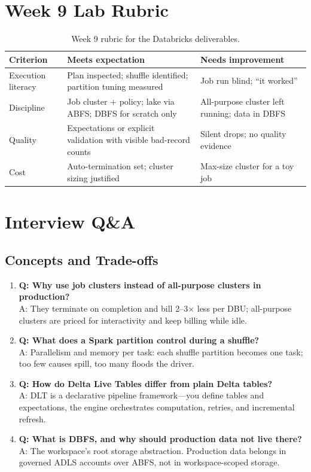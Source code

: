 \section{Week 9 Lab Rubric}
\begin{table}[H]
\centering
\small
\begin{tabular}{@{}p{3.2cm}p{5.0cm}p{5.0cm}@{}}
\toprule
\textbf{Criterion} & \textbf{Meets expectation} & \textbf{Needs improvement} \\
\midrule
Execution literacy & Plan inspected; shuffle identified; partition tuning measured & Job run blind; ``it worked'' \\
Discipline & Job cluster + policy; lake via ABFS; DBFS for scratch only & All-purpose cluster left running; data in DBFS \\
Quality & Expectations or explicit validation with visible bad-record counts & Silent drops; no quality evidence \\
Cost & Auto-termination set; cluster sizing justified & Max-size cluster for a toy job \\
\bottomrule
\end{tabular}
\caption{Week 9 rubric for the Databricks deliverables.}
\label{tab:ch9-rubric}
\end{table}

\section{Interview Q\&A}
\subsection{Concepts and Trade-offs}
\begin{enumerate}
    \item \textbf{Q: Why use job clusters instead of all-purpose clusters in production?}\\
    A: They terminate on completion and bill 2--3$\times$ less per DBU; all-purpose clusters are priced for interactivity and keep billing while idle.
    \item \textbf{Q: What does a Spark partition control during a shuffle?}\\
    A: Parallelism and memory per task: each shuffle partition becomes one task; too few causes spill, too many floods the driver.
    \item \textbf{Q: How do Delta Live Tables differ from plain Delta tables?}\\
    A: DLT is a declarative pipeline framework---you define tables and expectations, the engine orchestrates computation, retries, and incremental refresh.
    \item \textbf{Q: What is DBFS, and why should production data not live there?}\\
    A: The workspace's root storage abstraction. Production data belongs in governed ADLS accounts over ABFS, not in workspace-scoped storage.
\end{enumerate}

